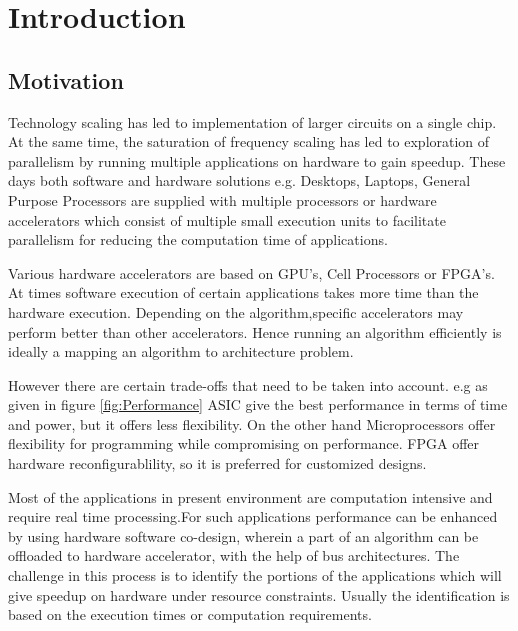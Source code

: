 \chapter{Introduction}
\label{ch1_introduction}
\section{Motivation}

Technology scaling has led to implementation of larger circuits on a single chip. At the same time, the saturation of frequency scaling has led to exploration of parallelism by running multiple applications on hardware to gain speedup. These days both software and hardware solutions e.g. Desktops, Laptops, General Purpose Processors are supplied with multiple processors or hardware accelerators which consist of multiple small execution units to facilitate parallelism for reducing the computation time of applications. 

\vspace{0.25cm}
 Various hardware accelerators are based on GPU's, Cell Processors or FPGA's. At times software execution of certain applications takes more time than the hardware execution. Depending on the algorithm,specific accelerators may perform better than other accelerators. Hence running an algorithm efficiently is ideally a mapping an algorithm to architecture problem.

\vspace{0.25cm}
 However there are certain trade-offs that need to be taken into account. e.g as given in figure \ref{fig:Performance} ASIC give the best performance in terms of time and power, but it offers less flexibility. On the other hand Microprocessors offer flexibility for programming while compromising on performance. FPGA offer hardware reconfigurablility, so it is preferred for customized designs.

\vspace{0.25cm}
 Most of the applications in present environment are computation intensive and require real time processing.For such applications performance can be enhanced by using hardware software co-design, wherein a part of an algorithm can be offloaded to hardware accelerator, with the help of bus architectures. The challenge in this process is to identify the portions of the applications which will give speedup on hardware under resource constraints. Usually the identification is based on the execution times or computation requirements.  

\vspace{0.25cm}

